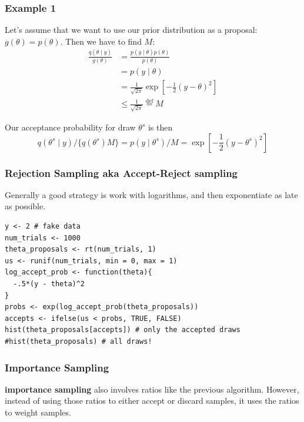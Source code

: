 \documentclass{beamer}
\begin{document}
\begin{frame}[fragile]
\frametitle{Example 1}

Let's assume that we want to use our prior distribution as a proposal: $g(\theta) = p(\theta)$. Then we have to find $M$:
\begin{align*}
\frac{q(\theta\mid y)}{g(\theta)} &= \frac{p(y \mid \theta) p(\theta)}{p(\theta)} \\
&= p(y \mid \theta) \\
&= \frac{1}{\sqrt{2\pi}} \exp\left[-\frac{1}{2} (y-\theta)^2 \right] \\
&\le \frac{1}{\sqrt{2\pi}} \overset{\text{def}}{=} M
\end{align*}

Our acceptance probability for draw $\theta^s$ is then
\[
q(\theta^s \mid y) / \{ q(\theta^s)  M\} = p(y \mid \theta^s) / M = \exp\left[-\frac{1}{2} (y-\theta^s)^2 \right]
\]


\end{frame}
\begin{frame}[fragile]
\frametitle{Rejection Sampling aka Accept-Reject sampling}

Generally a good strategy is work with logarithms, and then exponentiate as late as possible.
\begin{verbatim}
y <- 2 # fake data
num_trials <- 1000
theta_proposals <- rt(num_trials, 1)
us <- runif(num_trials, min = 0, max = 1)
log_accept_prob <- function(theta){
  -.5*(y - theta)^2
}
probs <- exp(log_accept_prob(theta_proposals))
accepts <- ifelse(us < probs, TRUE, FALSE)
hist(theta_proposals[accepts]) # only the accepted draws
#hist(theta_proposals) # all draws!
\end{verbatim}

\end{frame}

\begin{frame}[fragile]
\frametitle{Importance Sampling}

{\bf importance sampling} also involves ratios like the previous algorithm. However, instead of using those ratios to either accept or discard samples, it uses the ratios to weight samples. 
\newline


\end{frame}
\end{document}
